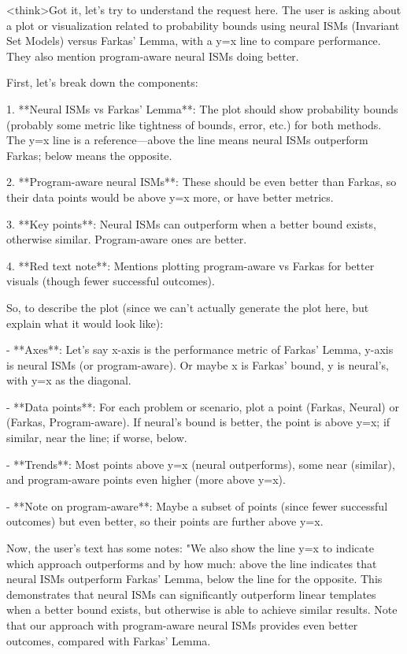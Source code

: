 <think>Got it, let's try to understand the request here. The user is asking about a plot or visualization related to probability bounds using neural ISMs (Invariant Set Models) versus Farkas' Lemma, with a y=x line to compare performance. They also mention program-aware neural ISMs doing better. 

First, let's break down the components:

1. **Neural ISMs vs Farkas' Lemma**: The plot should show probability bounds (probably some metric like tightness of bounds, error, etc.) for both methods. The y=x line is a reference—above the line means neural ISMs outperform Farkas; below means the opposite.

2. **Program-aware neural ISMs**: These should be even better than Farkas, so their data points would be above y=x more, or have better metrics.

3. **Key points**: Neural ISMs can outperform when a better bound exists, otherwise similar. Program-aware ones are better.

4. **Red text note**: Mentions plotting program-aware vs Farkas for better visuals (though fewer successful outcomes).

So, to describe the plot (since we can't actually generate the plot here, but explain what it would look like):

- **Axes**: Let's say x-axis is the performance metric of Farkas' Lemma, y-axis is neural ISMs (or program-aware). Or maybe x is Farkas' bound, y is neural's, with y=x as the diagonal.

- **Data points**: For each problem or scenario, plot a point (Farkas, Neural) or (Farkas, Program-aware). If neural's bound is better, the point is above y=x; if similar, near the line; if worse, below.

- **Trends**: Most points above y=x (neural outperforms), some near (similar), and program-aware points even higher (more above y=x).

- **Note on program-aware**: Maybe a subset of points (since fewer successful outcomes) but even better, so their points are further above y=x.

Now, the user's text has some notes: "We also show the line y=x to indicate which approach outperforms and by how much: above the line indicates that neural ISMs outperform Farkas' Lemma, below the line for the opposite. This demonstrates that neural ISMs can significantly outperform linear templates when a better bound exists, but otherwise is able to achieve similar results. Note that our approach with program-aware neural ISMs provides even better outcomes, compared with Farkas' Lemma. %

